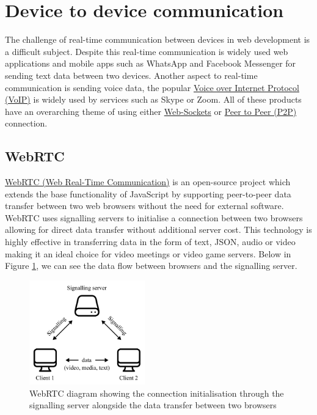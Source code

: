 \documentclass{l4proj}
\begin{document}
\section{Device to device communication}
The challenge of real-time communication between devices in web development is a difficult subject. Despite this real-time communication is widely used web applications and mobile apps such as WhatsApp and Facebook Messenger for sending text data between two devices. Another aspect to real-time communication is sending voice data, the popular \href{https://developer.mozilla.org/en-US/docs/Glossary/VoIP}{Voice over Internet Protocol (VoIP)} is widely used by services such as Skype or Zoom. All of these products have an overarching theme of using either \href{https://developer.mozilla.org/en-US/docs/Web/API/WebSocket}{Web-Sockets} or \href{https://developer.mozilla.org/en-US/docs/Glossary/P2P}{Peer to Peer (P2P)} connection.

\subsection{WebRTC}
\href{https://developer.mozilla.org/en-US/docs/Web/API/WebRTC_API}{WebRTC (Web Real-Time Communication)} \text is an open-source project which extends the base functionality of JavaScript by supporting peer-to-peer data transfer between two web browsers without the need for external software. WebRTC uses signalling servers to initialise a connection between two browsers allowing for direct data transfer without additional server cost. This technology is highly effective in transferring data in the form of text, JSON, audio or video making it an ideal choice for video meetings or video game servers. Below in Figure \ref{fig:webRTC}, we can see the data flow between browsers and the signalling server.

\begin{figure}[!ht]
    \centering
    \includegraphics[width=5cm]{dissertation/images/web-rtc-diagram.png}
    \caption{WebRTC diagram showing the connection initialisation through the signalling server alongside the data transfer between two browsers}
    \label{fig:webRTC}
\end{figure}
\end{document}
